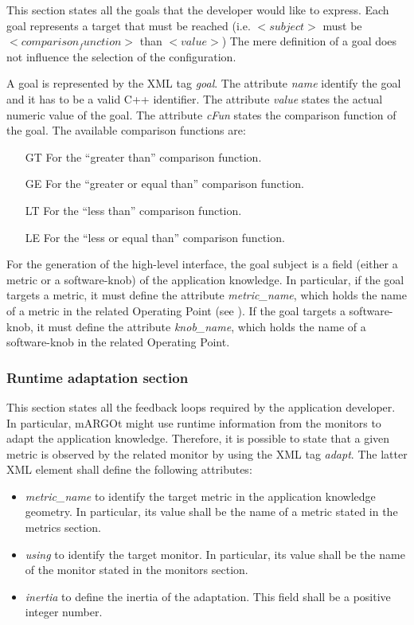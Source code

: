This section states all the goals that the developer would like to express.
Each goal represents a target that must be reached (i.e. \textit{$<subject>$} must be \textit{$<comparison_function>$} than \textit{$<value>$})
The mere definition of a goal does not influence the selection of the configuration.

A goal is represented by the XML tag \textit{goal}.
The attribute \textit{name} identify the goal and it has to be a valid C++ identifier.
The attribute \textit{value} states the actual numeric value of the goal.
The attribute \textit{cFun} states the comparison function of the goal.
The available comparison functions are:
\begin{enumerate}
	\item[GT] For the ``greater than'' comparison function.
	\item[GE] For the ``greater or equal than'' comparison function.
	\item[LT] For the ``less than'' comparison function.
	\item[LE] For the ``less or equal than'' comparison function.
\end{enumerate}

For the generation of the high-level interface, the goal subject is a field (either a metric or a software-knob) of the application knowledge.
In particular, if the goal targets a metric, it must define the attribute \textit{metric\_name}, which holds the name of a metric in the related Operating Point (see ).
If the goal targets a software-knob, it must define the attribute \textit{knob\_name}, which holds the name of a software-knob in the related Operating Point.


\subsubsection*{Runtime adaptation section}

This section states all the feedback loops required by the application developer.
In particular, mARGOt might use runtime information from the monitors to adapt the application knowledge.
Therefore, it is possible to state that a given metric is observed by the related monitor by using the XML tag \textit{adapt}.
The latter XML element shall define the following attributes:
\begin{itemize}
	\item \textit{metric\_name} to identify the target metric in the application knowledge geometry. In particular, its value shall be the name of a metric stated in the metrics section.
	\item \textit{using} to identify the target monitor. In particular, its value shall be the name of the monitor stated in the monitors section.
	\item \textit{inertia} to define the inertia of the adaptation. This field shall be a positive integer number.
\end{itemize}




